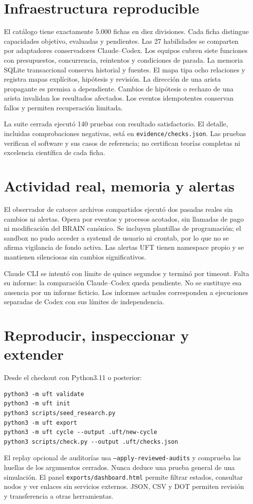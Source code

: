 \documentclass[11pt,a4paper]{article}
\begin{document}
\section{Infraestructura reproducible}
El catálogo tiene exactamente 5.000 fichas en diez divisiones. Cada ficha distingue
capacidades objetivo, evaluadas y pendientes. Las 27 habilidades se comparten por
adaptadores conservadores Claude--Codex. Los equipos cubren siete funciones con
presupuestos, concurrencia, reintentos y condiciones de parada.
La memoria SQLite transaccional conserva historial y fuentes. El mapa tipa ocho
relaciones y registra mapas explícitos, hipótesis y revisión. La dirección de una
arista propagante es premisa a dependiente. Cambios de hipótesis o rechazo de una
arista invalidan los resultados afectados. Los eventos idempotentes conservan
fallos y permiten recuperación limitada.

La suite cerrada ejecutó 140 pruebas con resultado satisfactorio. El detalle,
incluidas comprobaciones negativas, está en \texttt{evidence/checks.json}. Las
pruebas verifican el software y sus casos de referencia; no certifican teorías
completas ni excelencia científica de cada ficha.

\section{Actividad real, memoria y alertas}
El observador de catorce archivos compartidos ejecutó dos pasadas reales sin
cambios ni alertas. Opera por eventos y procesos acotados, sin llamadas de pago
ni modificación del BRAIN canónico. Se incluyen plantillas de programación;
el sandbox no pudo acceder a systemd de usuario ni crontab, por lo que no se
afirma vigilancia de fondo activa. Las alertas UFT tienen namespace propio y
se mantienen silenciosas sin cambios significativos.

Claude CLI se intentó con límite de quince segundos y terminó por timeout.
Falta su informe: la comparación Claude--Codex queda pendiente. No se sustituye
esa ausencia por un informe ficticio. Los informes actuales corresponden a
ejecuciones separadas de Codex con sus límites de independencia.

\section{Reproducir, inspeccionar y extender}
Desde el checkout con Python3.11 o posterior:
\begin{verbatim}
python3 -m uft validate
python3 -m uft init
python3 scripts/seed_research.py
python3 -m uft export
python3 -m uft cycle --output .uft/new-cycle
python3 scripts/check.py --output .uft/checks.json
\end{verbatim}
El replay opcional de auditorías usa \texttt{--apply-reviewed-audits} y comprueba
las huellas de los argumentos cerrados. Nunca deduce una prueba general de una
simulación. El panel \texttt{exports/dashboard.html} permite filtrar estados,
consultar nodos y ver enlaces sin servicios externos. JSON, CSV y DOT permiten
revisión y transferencia a otras herramientas.
\end{document}
